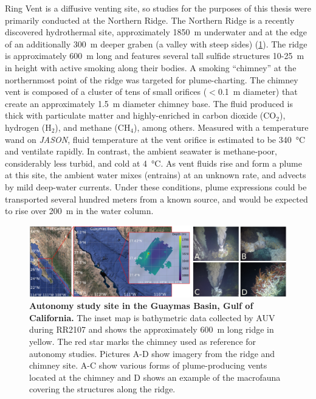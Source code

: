 Ring Vent is a diffusive venting site\autocite{teske2019characteristics}, so \Sentry studies for the purposes of this thesis were primarily conducted at the Northern Ridge. The Northern Ridge is a recently discovered hydrothermal site\autocite{soule2018exploration, geilert2018formation}, approximately \SI{1850}{\meter} underwater and at the edge of an additionally \SI{300}{\meter} deeper graben (a valley with steep sides) (\cref{fig:site}). The ridge is approximately \SI{600}{\meter} long and features several tall sulfide structures 10-\SI{25}{\meter} in height with active smoking along their bodies. A smoking ``chimney'' at the northernmost point of the ridge was targeted for plume-charting. The chimney vent is composed of a cluster of tens of small orifices ($<$\SI{0.1}{\meter} diameter) that create an approximately \SI{1.5}{\meter} diameter chimney base. The fluid produced is thick with particulate matter and highly-enriched in carbon dioxide (CO$_2$), hydrogen (H$_2$), and methane (CH$_4$), among others. Measured with a temperature wand on \emph{JASON}, fluid temperature at the vent orifice is estimated to be \SI{340}{\celsius} and ventilate rapidly. In contrast, the ambient seawater is methane-poor, considerably less turbid, and cold at \SI{4}{\celsius}. As vent fluids rise and form a plume at this site, the ambient water mixes (entrains) at an unknown rate, and advects by mild deep-water currents. Under these conditions, plume expressions could be transported several hundred meters from a known source, and would be expected to rise over \SI{200}{\meter} in the water column\autocite{speer1989model}.


\begin{figure}[!ht]
    \centering
    \includegraphics[width=\columnwidth]{figures/site_summary.png}
    \caption{\textbf{Autonomy study site in the Guaymas Basin, Gulf of California.} The inset map is bathymetric data collected by AUV \Sentry during RR2107 and shows the approximately \SI{600}{\meter} long ridge in yellow. The red star marks the chimney used as reference for autonomy studies. Pictures A-D show imagery from the ridge and chimney site. A-C show various forms of plume-producing vents located at the chimney and D shows an example of the macrofauna covering the structures along the ridge.}
    \label{fig:site}
\end{figure}
 

